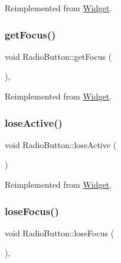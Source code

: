 Reimplemented from \mbox{\hyperlink{class_widget_a255e13ebf55d19f93a37b7a1aec9a87f}{Widget}}.

\mbox{\label{class_radio_button_a74c525b924c233535c3ee6a03fe89e3d}} 
\subsubsection{\texorpdfstring{getFocus()}{getFocus()}}
{\footnotesize\ttfamily void Radio\+Button\+::get\+Focus (\begin{DoxyParamCaption}{ }\end{DoxyParamCaption})\hspace{0.3cm}{\ttfamily [override]}, {\ttfamily [virtual]}}



Reimplemented from \mbox{\hyperlink{class_widget_a546c3b96bd793596c4902b4df0c41272}{Widget}}.

\mbox{\label{class_radio_button_a2a2c14c31db623a8cbe71dd82b12e01b}} 
\subsubsection{\texorpdfstring{loseActive()}{loseActive()}}
{\footnotesize\ttfamily void Radio\+Button\+::lose\+Active (\begin{DoxyParamCaption}{ }\end{DoxyParamCaption})\hspace{0.3cm}{\ttfamily [virtual]}}



Reimplemented from \mbox{\hyperlink{class_widget_a8d15d94eb8e41a82e9c4c0ee70a449b6}{Widget}}.

\mbox{\label{class_radio_button_a5cc3b7a4eb1a2ac7aead0cf4a589baca}} 
\subsubsection{\texorpdfstring{loseFocus()}{loseFocus()}}
{\footnotesize\ttfamily void Radio\+Button\+::lose\+Focus (\begin{DoxyParamCaption}{ }\end{DoxyParamCaption})\hspace{0.3cm}{\ttfamily [override]}, {\ttfamily [virtual]}}



